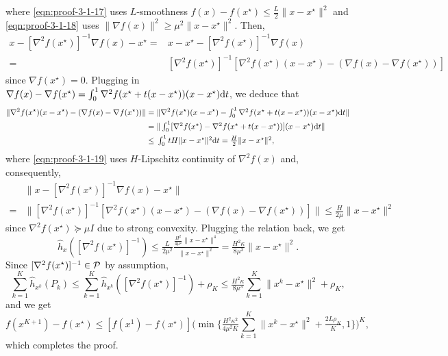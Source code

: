 where \eqref{eqn:proof-3-1-17} uses $L$-smoothness $f (x) - f (x^{\star}) \leq \tfrac{L}{2} \| x - x^{\star} \|^2$
and \eqref{eqn:proof-3-1-18} uses $\| \nabla f (x) \|^2 \geq \mu^2 \| x - x^{\star} \|^2$. Then,
\begin{align}
  x - [\nabla^2 f (x^{\star})]^{- 1} \nabla f (x) - x^{\star}={} & x - x^{\star} - [\nabla^2 f (x^{\star})]^{- 1} \nabla f (x) \nonumber\\
  ={} & [\nabla^2 f (x^{\star})]^{- 1} [\nabla^2 f (x^{\star}) (x - x^{\star}) -
  (\nabla f (x) - \nabla f (x^{\star}))]\nonumber
\end{align}
since $\nabla f(x^\star) = 0$. Plugging in $\nabla f (x) - \nabla f (x^{\star}) = \textstyle \int_0^1 \nabla^2 f (x^{\star} +
t (x - x^{\star})) (x - x^{\star}) \mathrm{d} t$, we deduce that
\begin{align}
\| \nabla^2 f (x^{\star}) (x - x^{\star}) - (\nabla f (x) - \nabla f
  (x^{\star}))\|={} & \|\nabla^2 f (x^{\star}) (x - x^{\star}) - \textstyle \int_0^1 \nabla^2 f (x^{\star}
  + t (x - x^{\star})) (x - x^{\star}) \mathrm{d} t \|\nonumber\\
  ={} & \|\textstyle \int_0^1 [\nabla^2 f (x^{\star}) - \nabla^2 f (x^{\star} + t (x -
  x^{\star}))] (x - x^{\star}) \mathrm{d} t \|\nonumber\\
  \leq{} & \textstyle \int_0^1 t H \| x - x^{\star} \|^2 \mathrm{d} t = \tfrac{H}{2} \| x -
  x^{\star} \|^2, \label{eqn:proof-3-1-19}
\end{align}
where \eqref{eqn:proof-3-1-19} uses $H$-Lipschitz continuity of $\nabla^2f(x)$
and, consequently,
\begin{align}
  & \| x - [\nabla^2 f (x^{\star})]^{- 1} \nabla f (x) - x^{\star} \|
  \nonumber\\
  ={} & \| [\nabla^2 f (x^{\star})]^{- 1} [\nabla^2 f (x^{\star}) (x -
  x^{\star}) - (\nabla f (x) - \nabla f (x^{\star}))] \| \leq \tfrac{H}{2 \mu}
  \| x - x^{\star} \|^2 \label{eqn:proof-3-1-auxi2}
\end{align}
since $\nabla^2 f(x^\star) \succeq \mu I$ due to strong convexity.
Plugging the relation back, we get
\begin{equation} \label{eqn:proof-2-1}
  \hat{h}_x ([\nabla^2 f (x^{\star})]^{- 1}) \leq \tfrac{L}{2 \mu^2}
   \tfrac{\tfrac{H^2}{4 \mu^2} \| x - x^{\star} \|^4}{\| x - x^{\star} \|^2} ={}
   \tfrac{H^2 \kappa}{8 \mu^3} \| x - x^{\star} \|^2.
\end{equation}
Since $[\nabla^2 f(x^\star)]^{-1} \in \mathcal{P}$ by assumption, 
\[ \textstyle \sum_{k = 1}^K \hat{h}_{x^k} (P_k) \leq \textstyle \sum_{k = 1}^K \hat{h}_{x^k} ([\nabla^2 f
   (x^{\star})]^{- 1}) + \rho_K \leq \tfrac{H^2 \kappa}{8 \mu^3} \textstyle \sum_{k =
   1}^K \| x^k - x^{\star} \|^2 + \rho_K, \]
and we get
\[ f (x^{K + 1}) - f (x^{\star}) \leq [f(x^1) - f(x^\star) ]\big(\min \big\{\tfrac{H^2 \kappa^2}{4 \mu^2 K}
   \textstyle \sum_{k = 1}^K \| x^k - x^{\star} \|^2 + \tfrac{2L \rho_K}{K}, 1\big\} \big)^K, \]
which completes the proof.

